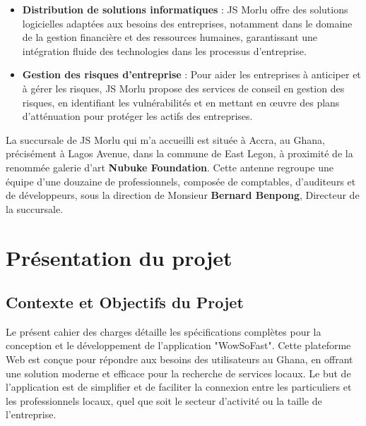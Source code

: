 {\begin{itemize}
\vspace{0.3cm}

\item \textbf{Distribution de solutions informatiques} :
JS Morlu offre des solutions logicielles adaptées aux besoins des entreprises, notamment dans le domaine de la gestion financière et des ressources humaines, garantissant une intégration fluide des technologies dans les processus d’entreprise.

\vspace{0.3cm}

\item \textbf{Gestion des risques d'entreprise} :
Pour aider les entreprises à anticiper et à gérer les risques, JS Morlu propose des services de conseil en gestion des risques, en identifiant les vulnérabilités et en mettant en œuvre des plans d’atténuation pour protéger les actifs des entreprises.

\end{itemize}

\vspace{0.5cm}

La succursale de JS Morlu qui m'a accueilli est située à Accra, au Ghana, précisément à Lagos Avenue, dans la commune de East Legon, à proximité de la renommée galerie d'art \textbf{Nubuke Foundation}. Cette antenne regroupe une équipe d'une douzaine de professionnels, composée de comptables, d'auditeurs et de développeurs, sous la direction de Monsieur \textbf{Bernard Benpong}, Directeur de la succursale.

\chapter{Présentation du projet}

\section{Contexte et Objectifs du Projet}

Le présent cahier des charges détaille les spécifications complètes pour la conception et le développement de l'application "WowSoFast". Cette plateforme Web est conçue pour répondre aux besoins des utilisateurs au Ghana, en offrant une solution moderne et efficace pour la recherche de services locaux. Le but de l'application est de simplifier et de faciliter la connexion entre les particuliers et les professionnels locaux, quel que soit le secteur d'activité ou la taille de l'entreprise.

}

